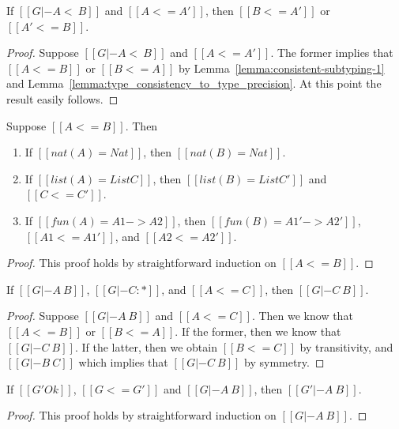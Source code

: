 \begin{lemma}
  \label{lemma:cons_subtype_to_type_pre}
  If $[[G |- A <~ B]]$ and $[[A <= A']]$, then $[[B <= A']]$ or $[[A' <= B]]$.
\end{lemma}
\begin{proof}
  Suppose $[[G |- A <~ B]]$ and $[[A <= A']]$.  The former implies
  that $[[A <= B]]$ or $[[B <= A]]$ by
  Lemma~\ref{lemma:consistent-subtyping-1} and
  Lemma~\ref{lemma:type_consistency_to_type_precision}.  At this
  point the result easily follows.
\end{proof}

\begin{lemma}
  \label{lemma:fun_type_pre}
  Suppose $[[A <= B]]$.  Then
  \begin{enumerate}[label=\roman*.,align=left]    
  \item If $[[nat(A) = Nat]]$, then $[[nat(B) = Nat]]$.    
  \item If $[[list(A) = List C]]$, then $[[list(B) = List C']]$ and $[[C <= C']]$.
  \item If $[[fun(A) = A1 -> A2]]$, then $[[fun(B) = A1' -> A2']]$, $[[A1 <= A1']]$, and $[[A2 <= A2']]$.
  \end{enumerate}
\end{lemma}
\begin{proof}
  This proof holds by straightforward induction on $[[A <= B]]$.
\end{proof}

\begin{lemma}
  \label{lemma:type_cons_type_pre_2}
  If $[[G |- A ~ B]]$, $[[G |- C : *]]$, and $[[A <= C]]$, then $[[G |- C ~ B]]$.
\end{lemma}
\begin{proof}
  Suppose $[[G |- A ~ B]]$ and $[[A <= C]]$.  Then we know
  that $[[A <= B]]$ or $[[B <= A]]$.  If the former, then
  we know that $[[G |- C ~ B]]$.  If the latter, then
  we obtain $[[B <= C]]$ by transitivity, and $[[G |- B ~ C]]$
  which implies that $[[G |- C ~ B]]$ by symmetry.
\end{proof}

\begin{lemma}
  \label{lemma:type_cons_ctx_pre}
  If $[[G' Ok]]$, $[[G <= G']]$ and $[[G |- A ~ B]]$, then $[[G' |- A ~ B]]$.
\end{lemma}
\begin{proof}
  This proof holds by straightforward induction on $[[G |- A ~ B]]$. 
\end{proof}


